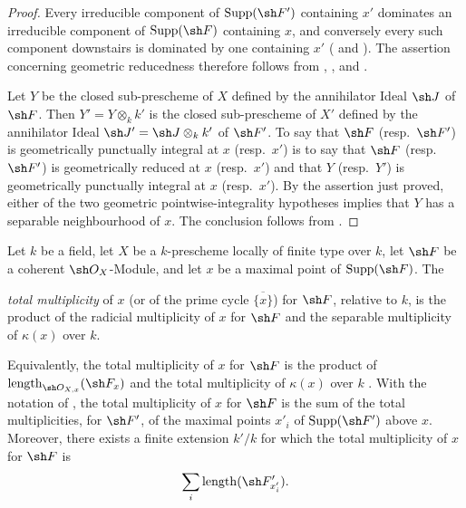 \begin{proof}
Every irreducible component of $\operatorname{Supp}(\sh F')$
containing $x'$ dominates an irreducible component of
$\operatorname{Supp}(\sh F)$ containing $x$, and conversely every
such component downstairs is dominated by one containing $x'$
( and ).
The assertion concerning geometric reducedness therefore follows
from , , and
.

Let $Y$ be the closed sub-prescheme of $X$ defined by the annihilator
Ideal $\sh J$ of $\sh F$.
Then $Y'=Y\otimes_k k'$ is the closed sub-prescheme of $X'$ defined by
the annihilator Ideal
$\sh J'=\sh J\otimes_k k'$ of $\sh F'$.
To say that $\sh F$ (resp.\ $\sh F'$) is geometrically punctually
integral at $x$ (resp.\ $x'$) is to say that $\sh F$ (resp.\
$\sh F'$) is geometrically reduced at $x$ (resp.\ $x'$) and that
$Y$ (resp.\ $Y'$) is geometrically punctually integral at $x$
(resp.\ $x'$).
By the assertion just proved, either of the two geometric
pointwise-integrality hypotheses implies that $Y$ has a separable
neighbourhood of $x$.
The conclusion follows from .
\end{proof}

\begin{definition}[4.7.12]
\label{IV.4.7.12}
Let $k$ be a field, let $X$ be a $k$-prescheme locally of finite type
over $k$, let $\sh F$ be a coherent $\sh O_X$-Module, and let $x$ be
a maximal point of $\operatorname{Supp}(\sh F)$.
The


\emph{total multiplicity} of $x$ (or of the prime cycle
$\overline{\{x\}}$) for $\sh F$, relative to $k$, is the product of
the radicial multiplicity of $x$ for $\sh F$ and the separable
multiplicity of $\kappa(x)$ over $k$.
\end{definition}

Equivalently, the total multiplicity of $x$ for $\sh F$ is the
product of
$\operatorname{length}_{\sh O_{X,x}}(\sh F_x)$ and the total
multiplicity of $\kappa(x)$ over $k$ .
With the notation of , the total multiplicity of $x$
for $\sh F$ is the sum of the total multiplicities, for $\sh F'$, of
the maximal points $x'_i$ of $\operatorname{Supp}(\sh F')$ above $x$.
Moreover, there exists a finite extension $k'/k$ for which the total
multiplicity of $x$ for $\sh F$ is
\[
\sum_i\operatorname{length}(\sh F'_{x'_i}).
\]

